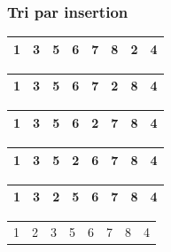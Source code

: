 \begin{frame}
\frametitle{Tri par insertion}
\begin{table}
\begin{tabular}{| c | c | c | c | c | c | c | c |}
\hline
\cellcolor{blue!25}1 & \cellcolor{blue!25}3 & \cellcolor{blue!25}5 & \cellcolor{blue!25}6 & \cellcolor{blue!25}7 & \cellcolor{blue!25}8 & \cellcolor{red!25}2 & 4 \\ 
\hline
\end{tabular}
\end{table}
\begin{table}
\begin{tabular}{| c | c | c | c | c | c | c | c |}
\hline
\cellcolor{blue!25}1 & \cellcolor{blue!25}3 & \cellcolor{blue!25}5 & \cellcolor{blue!25}6 & \cellcolor{blue!25}7 & \cellcolor{red!25}2 & \cellcolor{blue!25}8 & 4 \\ 
\hline
\end{tabular}
\end{table}
\begin{table}
\begin{tabular}{| c | c | c | c | c | c | c | c |}
\hline
\cellcolor{blue!25}1 & \cellcolor{blue!25}3 & \cellcolor{blue!25}5 & \cellcolor{blue!25}6 & \cellcolor{red!25}2 & \cellcolor{blue!25}7 & \cellcolor{blue!25}8 & 4 \\ 
\hline
\end{tabular}
\end{table}
\begin{table}
\begin{tabular}{| c | c | c | c | c | c | c | c |}
\hline
\cellcolor{blue!25}1 & \cellcolor{blue!25}3 & \cellcolor{blue!25}5 & \cellcolor{red!25}2 & \cellcolor{blue!25}6 & \cellcolor{blue!25}7 & \cellcolor{blue!25}8 & 4 \\ 
\hline
\end{tabular}
\end{table}
\begin{table}
\begin{tabular}{| c | c | c | c | c | c | c | c |}
\hline
\cellcolor{blue!25}1 & \cellcolor{blue!25}3 & \cellcolor{red!25}2 & \cellcolor{blue!25}5 & \cellcolor{blue!25}6 & \cellcolor{blue!25}7 & \cellcolor{blue!25}8 & 4 \\ 
\hline
\end{tabular}
\end{table}
\begin{table}
\begin{tabular}{| c | c | c | c | c | c | c | c |}
\hline
\cellcolor{blue!25}1 & \cellcolor{red!25}2 & \cellcolor{blue!25}3 & \cellcolor{blue!25}5 & \cellcolor{blue!25}6 & \cellcolor{blue!25}7 & \cellcolor{blue!25}8 & 4 \\ 

\end{tabular}
\end{table}
\end{frame}
